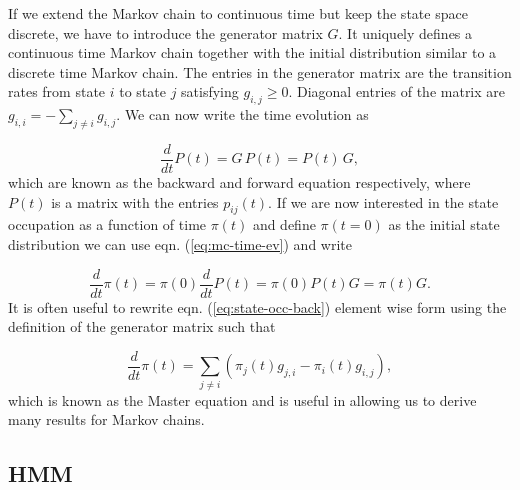 If we extend the Markov chain to continuous time but keep the state space discrete, we have to introduce the generator matrix $G$. It uniquely defines a continuous time Markov chain together with the initial distribution similar to a  discrete time Markov chain. The entries in the generator matrix are the transition rates from state $i$ to state $j$ satisfying $g_{i,j} \geq 0$. Diagonal entries of the matrix are $g_{i,i} = - \sum_{j \neq i} g_{i,j}$. We can now write the time evolution as

\begin{equation}
  \label{eq:mc-time-ev}
  \frac{d}{dt} P(t) = G\, P(t) = P(t)\, G,
\end{equation}
which are known as the backward and forward equation respectively, where $P(t)$ is a matrix with the entries $p_{ij}(t)$. If we are now interested in the state occupation as a function of time $\pi(t)$ and define $\pi(t=0)$ as the initial state distribution we can use eqn. (\ref{eq:mc-time-ev}) and write

\begin{equation}
  \label{eq:state-occ-back}
  \frac{d}{dt}\pi(t) = \pi(0) \frac{d}{dt} P(t) = \pi(0) P(t) G = \pi(t)G.
\end{equation}
It is often useful to rewrite eqn. (\ref{eq:state-occ-back}) element wise form using the definition of the generator matrix such that

\begin{equation}
  \label{eq:mc-master}
  \frac{d}{dt} \pi (t) = \sum_{j\neq i} \left( \pi_j(t)g_{j,i} - \pi_i(t)g_{i,j} \right),
\end{equation}
which is known as the Master equation and is useful in allowing us to derive many results for Markov chains.

\subsection{HMM}
\label{sec:hmm}

